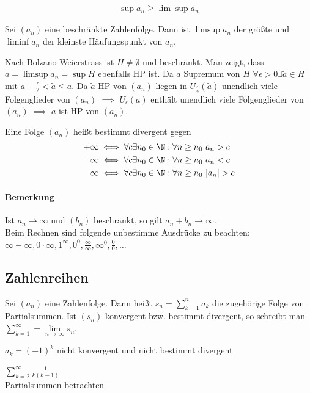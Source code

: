 \begin{align*}
		\sup a_n \geq \lim\sup a_n
	\end{align*}
\begin{theorem}
	Sei $(a_n)$ eine beschränkte Zahlenfolge. Dann ist $\limsup a_n$ der größte und $\liminf a_n$ der kleinste Häufungspunkt von $a_n$.
\end{theorem}
\prove Nach Bolzano-Weierstrass ist $H\neq \emptyset$ und beschränkt. Man zeigt, dass $a=\limsup a_n=\sup H$ ebenfalls HP ist. Da $a$ Supremum von $H$ $\forall \epsilon > 0 \exists \tilde{a} \in H$ mit $a-\frac{\epsilon}{2}<\tilde{a} \leq a$. Da $\tilde{a}$ HP von $(a_n)$ liegen in $U_{\frac{\epsilon}{2}}(\tilde{a})$ unendlich viele Folgenglieder von $(a_n)$ $\implies$ $U_{\epsilon}(a)$ enthält unendlich viele Folgenglieder von $(a_n)$ $\implies$ $a$ ist HP von $(a_n)$.
\begin{definition}
	Eine Folge $(a_n)$ heißt bestimmt divergent gegen
	\begin{align*}
		+\infty &\iff \forall c \exists n_0 \in \N: \forall n\geq n_0\ a_n >c\\
-\infty &\iff \forall c \exists n_0 \in \N: \forall n\geq n_0\ a_n <c\\
\infty &\iff \forall c \exists n_0 \in \N: \forall n\geq n_0\ |a_n|>c
	\end{align*}
\end{definition}
\paragraph{Bemerkung} Ist $a_n \to \infty$ und $(b_n)$ beschränkt, so gilt $a_n+b_n\to \infty$.\\
Beim Rechnen sind folgende unbestimme Ausdrücke zu beachten: $\infty-\infty, 0\cdot \infty, 1^{\infty}, 0^0, \frac{\infty}{\infty}, \infty^0, \frac{0}{0}, \dots$
\subsection{Zahlenreihen}
\begin{definition}
	Sei $(a_n)$ eine Zahlenfolge. Dann heißt $s_n = \sum\limits_{k=1}^n a_k$ die zugehörige Folge von Partialsummen. Ist $(s_n)$ konvergent bzw. bestimmt divergent, so schreibt man $\sum\limits_{k=1}^{\infty}=\lim\limits_{n\to \infty}s_n$.
\end{definition}
\begin{example}
	$a_k=(-1)^k$ nicht konvergent und nicht bestimmt divergent
\end{example}
\begin{example}
	$\sum\limits_{k=2}^{\infty}\frac{1}{k(k-1)}$\\
	Partialsummen betrachten
\end{example}
